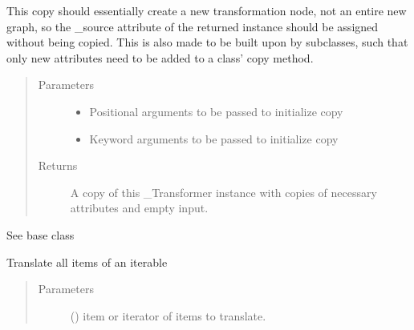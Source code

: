 \documentclass[letterpaper,10pt,english]{sphinxmanual}
\begin{document}
\begin{fulllineitems}
\begin{fulllineitems}
This copy should essentially create a new transformation node, not an
entire new graph, so the \_source attribute of the returned instance
should be assigned without being copied. This is also made to be built
upon by subclasses, such that only new attributes need to be added to
a class’ copy method.
\begin{quote}\begin{description}
\item[{Parameters}] \leavevmode\begin{itemize}
\item {} 
 \textendash{} Positional arguments to be passed to initialize copy

\item {} 
 \textendash{} Keyword arguments to be passed to initialize copy

\end{itemize}

\item[{Returns}] \leavevmode
A copy of this \_Transformer instance with copies of necessary
attributes and empty input.

\end{description}\end{quote}

\end{fulllineitems}


\begin{fulllineitems}
\label{\detokenize{dalio.translator:dalio.translator.translator.Translator.set_input}}
See base class

\end{fulllineitems}


\begin{fulllineitems}
\label{\detokenize{dalio.translator:dalio.translator.translator.Translator.translate_item}}
Translate all items of an iterable
\begin{quote}\begin{description}
\item[{Parameters}] \leavevmode
{} (\sphinxstyleliteralemphasis{\sphinxupquote{, }}) \textendash{} item or iterator of items to translate.


\end{description}
\end{quote}
\end{fulllineitems}
\end{fulllineitems}
\end{document}
